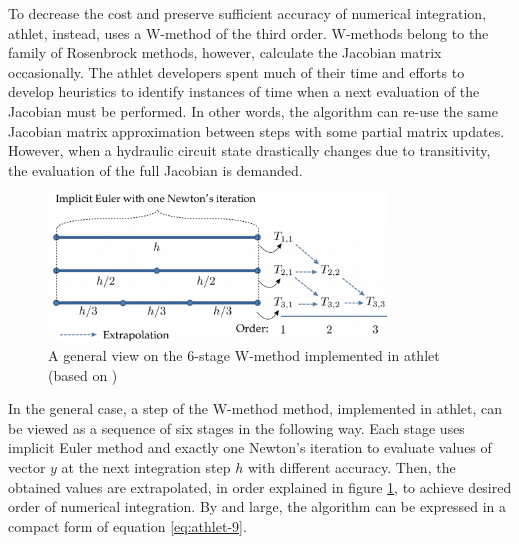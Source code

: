 To decrease the cost and preserve sufficient accuracy of numerical integration, \acrshort{athlet}, instead, uses a W-method of the third order. W-methods belong to the family of Rosenbrock methods, however, calculate the Jacobian matrix occasionally. The \acrshort{athlet} developers spent much of their time and efforts to develop heuristics to identify instances of time when a next evaluation of the Jacobian must be performed. In other words, the algorithm can re-use the same Jacobian matrix approximation between steps with some partial matrix updates. However, when a hydraulic circuit state drastically changes due to transitivity, the evaluation of the full Jacobian is demanded.\\


\figpointer{\ref{fig:introduction-w-method-scheme}}
\begin{figure}[htpb]
  \centering
  \includegraphics[width=0.8\textwidth]{figures/introduction-rosenbrock-scheme.png}
\caption{A general view on the 6-stage W-method implemented in \acrshort{athlet} (based on \cite{tims-presentation})}
\label{fig:introduction-w-method-scheme}
\end{figure}

In the general case, a step of the W-method method, implemented in \acrshort{athlet}, can be viewed as a sequence of six stages in the following way. Each stage uses implicit Euler method and exactly one Newton's iteration to evaluate values of vector $y$ at the next integration step $h$ with different accuracy. Then, the obtained values are extrapolated, in order explained in figure \ref{fig:introduction-w-method-scheme}, to achieve desired order of numerical integration. By and large, the algorithm can be expressed in a compact form of equation \ref{eq:athlet-9}.


